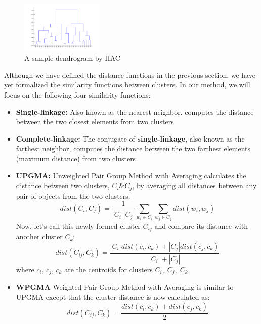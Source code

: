 \documentclass[conference]{IEEEtran}
\begin{document}
\begin{figure}[h]
	\center	
	\includegraphics[width=0.35\textwidth]{fig/dendrogram.png}
	\caption{A sample dendrogram by HAC}
	\label{dendrogram}
\end{figure}

Although we have defined the distance functions in the previous section, we have yet formalized the similarity functions between clusters. In our method, we will focus on the following four similarity functions:

\begin{itemize}
	\item \textbf{Single-linkage:} Also known as the nearest neighbor, computes the distance between the two closest elements from two clusters
	\item \textbf{Complete-linkage:} The conjugate of \textbf{single-linkage}, also known as the farthest neighbor, computes the distance between the two farthest elements (maximum distance) from two clusters
	\item \textbf{UPGMA: } Unweighted Pair Group Method with Averaging calculates the distance between two clusters, $C_i \& C_j$, by averaging all distances between any pair of objects from the two clusters.
	\begin{equation*}
		dist(C_i, C_j) = \frac{1}{|C_i||C_j|}\sum_{w_i \in C_i}\sum_{w_j \in C_j}dist(w_i, w_j)
	\end{equation*}
	Now, let's call this newly-formed cluster $C_{ij}$ and compare its distance with another cluster $C_k$:
	\begin{equation*}
		dist(C_{ij}, C_k) =  \frac{|C_i|dist(c_i,c_k) + |C_j|dist(c_j,c_k)}{|C_i|+|C_j|}
	\end{equation*}
	where $c_i,\,c_j,\,c_k$ are the centroids for clusters $C_i,\;C_j,\;C_k$
	\item \textbf{WPGMA} Weighted Pair Group Method with Averaging is similar to UPGMA except that the cluster distance is now calculated as:
	\begin{equation*}
		dist(C_{ij}, C_k) =  \frac{dist(c_i,c_k) + dist(c_j,c_k)}{2}
	\end{equation*}
\end{itemize}
\end{document}
